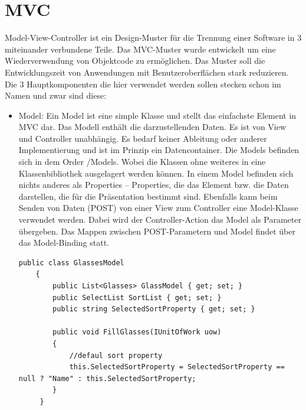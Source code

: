 \section{MVC}
Model-View-Controller ist ein Design-Muster für die Trennung einer Software in 3 miteinander verbundene Teile. Das MVC-Muster wurde entwickelt um eine Wiederverwendung von Objektcode zu ermöglichen. Das Muster soll die Entwicklungszeit von Anwendungen mit Benutzeroberflächen stark  reduzieren. 
Die 3 Hauptkomponenten die hier verwendet werden sollen stecken schon im Namen und zwar sind diese: 
\begin{itemize}

\item Model: Ein Model ist eine simple Klasse und stellt das einfachste Element in MVC dar. Das Modell enthält die darzustellenden Daten. Es ist von View und Controller unabhängig. Es bedarf keiner Ableitung oder anderer Implementierung und ist im Prinzip ein Datencontainer. Die Models befinden sich in dem Order /Models. Wobei die Klassen ohne weiteres in eine Klassenbibliothek ausgelagert werden können. In einem Model befinden sich nichts anderes als Properties – Properties, die das Element bzw. die Daten darstellen, die für die Präsentation bestimmt sind. Ebenfalls kann beim Senden von Daten (POST) von einer View zum Controller eine Model-Klasse verwendet werden. Dabei wird der Controller-Action das Model als Parameter übergeben. Das Mappen zwischen POST-Parametern und Model findet über das Model-Binding statt.
\begin{lstlisting}
public class GlassesModel
    {
        public List<Glasses> GlassModel { get; set; }
        public SelectList SortList { get; set; }
        public string SelectedSortProperty { get; set; }

        public void FillGlasses(IUnitOfWork uow)
        {
            //defaul sort property
            this.SelectedSortProperty = SelectedSortProperty == null ? "Name" : this.SelectedSortProperty;
        }
     }
\end{lstlisting}


\end{itemize}
